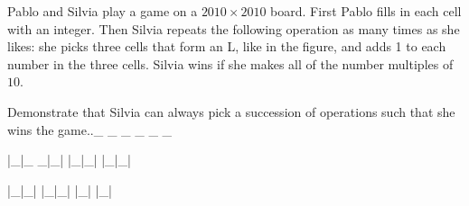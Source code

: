 Pablo and Silvia play a game on a $2010\times{2010}$ board. First Pablo fills in each cell with an integer. Then Silvia repeats the following operation as many times as she likes: she picks three cells that form an L, like in the figure, and adds 1 to each number in the three cells. Silvia wins if she makes all of the number multiples of $10$.

Demonstrate that Silvia can always pick a succession of operations such that she wins the game.._       _   _ _   _ _

|_|_   _|_| |_|_| |_|_|

|_|_| |_|_| |_|     |_|